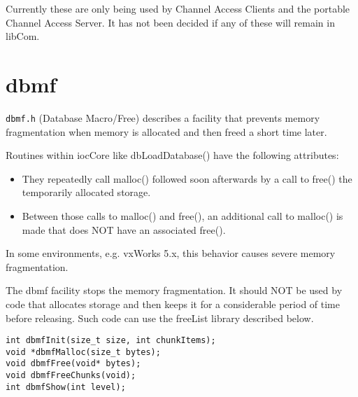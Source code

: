 Currently these are only being used by Channel Access Clients and the portable Channel Access Server.
It has not been decided if any of these will remain in libCom.

\section{dbmf}

\verb|dbmf.h| (Database Macro/Free) describes a facility that prevents memory fragmentation when memory is allocated and then freed a short time later.

Routines within iocCore like dbLoadDatabase() have the following attributes:

\begin{itemize}
\item They repeatedly call malloc() followed soon afterwards by a call to free() the temporarily allocated storage.

\item Between those calls to malloc() and free(), an additional call to malloc() is made that does NOT have an associated free().

\end{itemize}

In some environments, e.g. vxWorks 5.x, this behavior causes severe memory fragmentation.

The dbmf facility stops the memory fragmentation.
It should NOT be used by code that allocates storage and then keeps it for a considerable period of time before releasing.
Such code can use the freeList library described below.

\begin{verbatim}
int dbmfInit(size_t size, int chunkItems);
void *dbmfMalloc(size_t bytes);
void dbmfFree(void* bytes);
void dbmfFreeChunks(void);
int dbmfShow(int level);
\end{verbatim}

